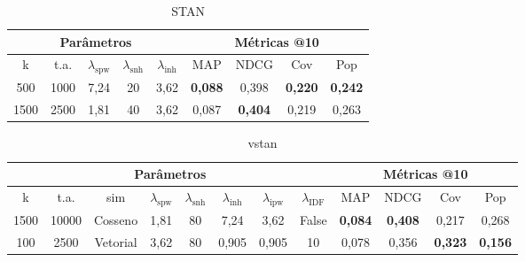 \begin{table}[htbp]
  \centering
  \begin{tabular}{|c|c|c|c|c|c|c|c|c|}
    \hline
      \multicolumn{5}{|c|}{Parâmetros} & \multicolumn{4}{c|}{Métricas @10} \\
      \hline
      k & t.a. & $\lambda_{\text{spw}}$ & $\lambda_{\text{snh}}$ & $\lambda_{\text{inh}}$ & MAP & NDCG & Cov & Pop \\
      \hline
      500 & 1000 & 7,24 & 20 & 3,62 & \textbf{0,088} & 0,398 & \textbf{0,220} & \textbf{0,242} \\
      \hline
      1500 & 2500 & 1,81 & 40 & 3,62 & 0,087 & \textbf{0,404} & 0,219 & 0,263 \\
      \hline 
\end{tabular}
      \caption{STAN}
      \label{opt:stan_rem}
\end{table}

\begin{table}[htbp]
  \centering
  \begin{tabular}{|c|c|c|c|c|c|c|c|c|c|c|c|}
    \hline
      \multicolumn{8}{|c|}{Parâmetros} & \multicolumn{4}{c|}{Métricas @10} \\
      \hline
      k & t.a. & sim & $\lambda_{\text{spw}}$ & $\lambda_{\text{snh}}$ & $\lambda_{\text{inh}}$ & $\lambda_{\text{ipw}}$ & $\lambda_{\text{IDF}}$ & MAP & NDCG & Cov & Pop \\
      \hline
      1500 & 10000 & Cosseno & 1,81 & 80 & 7,24 & 3,62 & False & \textbf{0,084} & \textbf{0,408} & 0,217 & 0,268 \\
      \hline
      100 & 2500 & Vetorial & 3,62 & 80 & 0,905 & 0,905 & 10 & 0,078 & 0,356 & \textbf{0,323} & \textbf{0,156} \\
      \hline
\end{tabular}
      \caption{vstan}
      \label{opt:vstan_rem}
\end{table}

